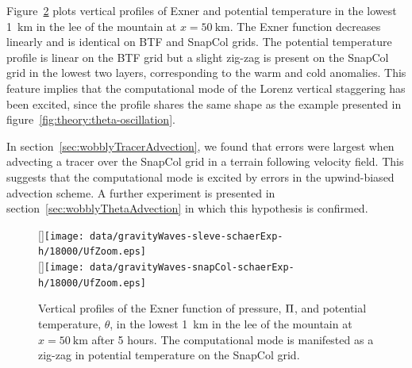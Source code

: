 Figure~\ref{fig:gw:exner-theta} plots vertical profiles of Exner and potential temperature in the lowest \SI{1}{\kilo\meter} in the lee of the mountain at $x = \SI{50}{\kilo\meter}$.  The Exner function decreases linearly and is identical on BTF and SnapCol grids.  The potential temperature profile is linear on the BTF grid but a slight zig-zag is present on the SnapCol grid in the lowest two layers, corresponding to the warm and cold anomalies.  
This feature implies that the computational mode of the Lorenz vertical staggering has been excited, since the profile shares the same shape as the example presented in figure~\ref{fig:theory:theta-oscillation}.

In section~\ref{sec:wobblyTracerAdvection}, we found that errors were largest when advecting a tracer over the SnapCol grid in a terrain following velocity field.  This suggests that the computational mode is excited by errors in the upwind-biased advection scheme.  A further experiment is presented in section~\ref{sec:wobblyThetaAdvection} in which this hypothesis is confirmed. 

\begin{figure}
	\captionsetup[subfigure]{position=b}
	\centering
	[\textwidth]{\texttt{[image: data/gravityWaves-sleve-schaerExp-h/18000/UfZoom.eps]}} \\
	[\textwidth]{\texttt{[image: data/gravityWaves-snapCol-schaerExp-h/18000/UfZoom.eps]}}
%
	\caption{}
	\label{fig:gw:flow}
\end{figure}

\begin{figure}
	\centering
	
	\caption{Vertical profiles of the Exner function of pressure, $\Pi$, and potential temperature, $\theta$, in the lowest \SI{1}{\kilo\meter} in the lee of the mountain at $x = \SI{50}{\kilo\meter}$ after 5 hours.  The computational mode is manifested as a zig-zag in potential temperature on the SnapCol grid.}
	\label{fig:gw:exner-theta}
\end{figure}



